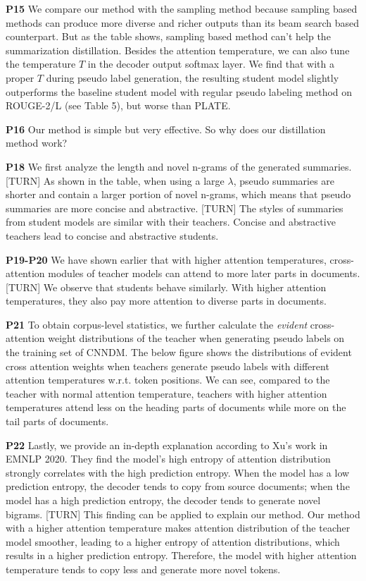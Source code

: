 \documentclass[a4paper, 12pt]{article}
\begin{document}
\textbf{P15}
We compare our method with the sampling method because sampling based methods can produce more diverse and richer outputs than its beam search based counterpart. But as the table shows, sampling based method can't help the summarization distillation. 
Besides the attention temperature, we can also tune the temperature $T$ in the decoder output softmax layer. We find that with a proper $T$ during pseudo label generation, the resulting student model slightly outperforms the baseline student model with regular pseudo labeling method on ROUGE-2/L (see Table 5), but worse than PLATE.


\textbf{P16}
Our method is simple but very effective. So why does our distillation method work?

\textbf{P18}
We first analyze the length and novel n-grams of the generated summaries. 
[TURN]
As shown in the table, when using a large $\lambda$, pseudo summaries are shorter and contain a larger portion of novel n-grams, which means that pseudo summaries are more concise and abstractive.
[TURN]
The styles of summaries from student models are similar with their teachers. Concise and abstractive teachers lead to concise and abstractive students.

\textbf{P19-P20}
We have shown earlier that with higher attention temperatures, cross-attention modules of teacher models can attend to more later parts in documents. [TURN]
We observe that students behave similarly. With higher attention temperatures, they also pay more attention to diverse parts in documents.

\textbf{P21}
To obtain corpus-level statistics, we further calculate the \emph{evident} cross-attention weight distributions of the teacher when generating pseudo labels on the training set of CNNDM.
The below figure shows the distributions of evident cross attention weights when teachers generate pseudo labels with different attention temperatures w.r.t. token positions.
We can see, compared to the teacher with normal attention temperature, teachers with higher attention temperatures attend less on the heading parts of documents while more on the tail parts of documents. 

\textbf{P22}
Lastly, we provide an in-depth explanation according to Xu's work in EMNLP 2020. They find the model's high entropy of attention distribution strongly correlates with the high prediction entropy. When the model has a low prediction entropy, the decoder tends to copy from source documents; when the model has a high prediction entropy, the decoder tends to generate novel bigrams.
[TURN]
This finding can be applied to explain our method. Our method with a higher attention temperature makes attention distribution of the teacher model smoother, leading to a higher entropy of attention distributions, which results in a higher prediction entropy. Therefore, the model with higher attention temperature tends to copy less and generate more novel tokens.
\end{document}
